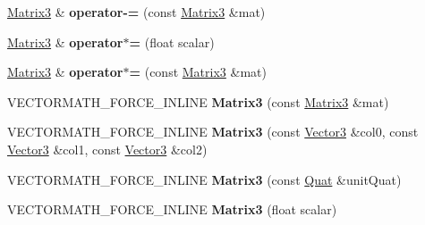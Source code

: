 \begin{DoxyCompactItemize}
\hyperlink{classVectormath_1_1Aos_1_1Matrix3}{Matrix3} \& {\bfseries operator-\/=} (const \hyperlink{classVectormath_1_1Aos_1_1Matrix3}{Matrix3} \&mat)
\item 
\mbox{\label{classVectormath_1_1Aos_1_1Matrix3_a17e33a77a377918fbe189c6dd192dd56}} 
\hyperlink{classVectormath_1_1Aos_1_1Matrix3}{Matrix3} \& {\bfseries operator$\ast$=} (float scalar)
\item 
\mbox{\label{classVectormath_1_1Aos_1_1Matrix3_ac41072ce7f3bf177037085ff23671b55}} 
\hyperlink{classVectormath_1_1Aos_1_1Matrix3}{Matrix3} \& {\bfseries operator$\ast$=} (const \hyperlink{classVectormath_1_1Aos_1_1Matrix3}{Matrix3} \&mat)
\item 
\mbox{\label{classVectormath_1_1Aos_1_1Matrix3_a70ed1efea22260aaf3feb09bfdae1cd1}} 
V\+E\+C\+T\+O\+R\+M\+A\+T\+H\+\_\+\+F\+O\+R\+C\+E\+\_\+\+I\+N\+L\+I\+NE {\bfseries Matrix3} (const \hyperlink{classVectormath_1_1Aos_1_1Matrix3}{Matrix3} \&mat)
\item 
\mbox{\label{classVectormath_1_1Aos_1_1Matrix3_ae2f8a0046818a2cd2d2c4be443e73cb1}} 
V\+E\+C\+T\+O\+R\+M\+A\+T\+H\+\_\+\+F\+O\+R\+C\+E\+\_\+\+I\+N\+L\+I\+NE {\bfseries Matrix3} (const \hyperlink{classVectormath_1_1Aos_1_1Vector3}{Vector3} \&col0, const \hyperlink{classVectormath_1_1Aos_1_1Vector3}{Vector3} \&col1, const \hyperlink{classVectormath_1_1Aos_1_1Vector3}{Vector3} \&col2)
\item 
\mbox{\label{classVectormath_1_1Aos_1_1Matrix3_adc65495cc7d3528f539437ff760aee77}} 
V\+E\+C\+T\+O\+R\+M\+A\+T\+H\+\_\+\+F\+O\+R\+C\+E\+\_\+\+I\+N\+L\+I\+NE {\bfseries Matrix3} (const \hyperlink{classVectormath_1_1Aos_1_1Quat}{Quat} \&unit\+Quat)
\item 
\mbox{\label{classVectormath_1_1Aos_1_1Matrix3_acbf606567d34e43be0b7a90544bd5153}} 
V\+E\+C\+T\+O\+R\+M\+A\+T\+H\+\_\+\+F\+O\+R\+C\+E\+\_\+\+I\+N\+L\+I\+NE {\bfseries Matrix3} (float scalar)
\item 
\mbox{\label{classVectormath_1_1Aos_1_1Matrix3_a81e902638d14176fd5835b14ff2fba8e}} 

\end{DoxyCompactItemize}
